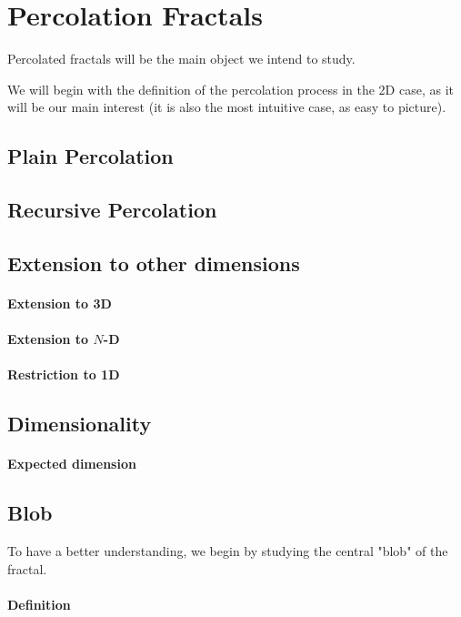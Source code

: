 \section{Percolation Fractals}
Percolated fractals will be the main object we intend to study.

We will begin with the definition of the percolation process in the 2D case, as it will be our main interest (it is also the most intuitive case, as easy to picture).

\subsection{Plain Percolation}
\subsection{Recursive Percolation}
\subsection{Extension to other dimensions}
\paragraph{Extension to 3D}
\paragraph{Extension to $N$-D}
\paragraph{Restriction to 1D}

\subsection{Dimensionality}
\paragraph{Expected dimension}

\subsection{Blob}
To have a better understanding, we begin by studying the central "blob" of the fractal.
\paragraph{Definition}
